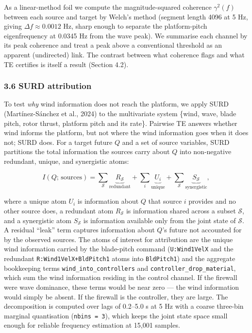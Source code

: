 \documentclass[
  english,
  11pt,
]{article}
\begin{document}
As a linear-method foil we compute the magnitude-squared coherence
\(\gamma^2(f)\) between each source and target by Welch's method
(segment length 4096 at 5 Hz, giving \(\Delta f \approx 0.0012\) Hz,
sharp enough to separate the platform-pitch eigenfrequency at 0.0345 Hz
from the wave peak). We summarise each channel by its peak coherence and
treat a peak above a conventional threshold as an apparent (undirected)
link. The contrast between what coherence flags and what TE certifies is
itself a result (Section 4.2).

\subsubsection{3.6 SURD attribution}\label{surd-attribution}

To test \emph{why} wind information does not reach the platform, we
apply SURD (Martínez-Sánchez et al., 2024) to the multivariate system
\{wind, wave, blade pitch, rotor thrust, platform pitch and its rate\}.
Pairwise TE answers whether wind informs the platform, but not where the
wind information goes when it does not; SURD does. For a target future
\(Q\) and a set of source variables, SURD partitions the total
information the sources carry about \(Q\) into non-negative redundant,
unique, and synergistic atoms:

\[
I\!\left(Q; \, \text{sources}\right) = \sum_{\mathcal{S}} \underbrace{R_{\mathcal{S}}}_{\text{redundant}} + \sum_{i} \underbrace{U_{i}}_{\text{unique}} + \sum_{\mathcal{S}} \underbrace{S_{\mathcal{S}}}_{\text{synergistic}} ,
\]

where a unique atom \(U_i\) is information about \(Q\) that source \(i\)
provides and no other source does, a redundant atom \(R_{\mathcal{S}}\)
is information shared across a subset \(\mathcal{S}\), and a synergistic
atom \(S_{\mathcal{S}}\) is information available only from the joint
state of \(\mathcal{S}\). A residual ``leak'' term captures information
about \(Q\)'s future not accounted for by the observed sources. The
atoms of interest for attribution are the unique wind information
carried by the blade-pitch command (\texttt{U:Wind1VelX} and the
redundant \texttt{R:Wind1VelX+BldPitch1} atoms into \texttt{BldPitch1})
and the aggregate bookkeeping terms \texttt{wind\_into\_controllers} and
\texttt{controller\_drop\_material}, which sum the wind information
residing in the control channel. If the firewall were wave dominance,
these terms would be near zero --- the wind information would simply be
absent. If the firewall is the controller, they are large. The
decomposition is computed over lags of 0.2--5.0 s at 5 Hz with a coarse
three-bin marginal quantisation (\texttt{nbins\ =\ 3}), which keeps the
joint state space small enough for reliable frequency estimation at
15,001 samples.
\end{document}
